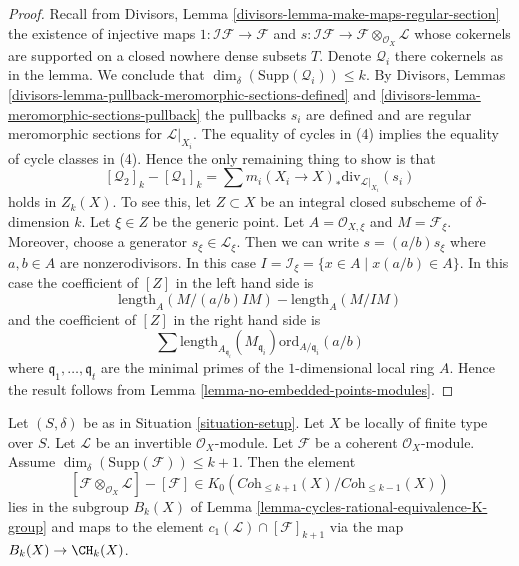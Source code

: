 \begin{proof}
Recall from Divisors, Lemma \ref{divisors-lemma-make-maps-regular-section}
the existence of injective maps
$1 : \mathcal{I}\mathcal{F} \to \mathcal{F}$ and
$s : \mathcal{I}\mathcal{F} \to \mathcal{F} \otimes_{\mathcal{O}_X}\mathcal{L}$
whose cokernels are supported on a closed nowhere dense subsets $T$.
Denote $\mathcal{Q}_i$ there cokernels as in the lemma.
We conclude that $\dim_\delta(\text{Supp}(\mathcal{Q}_i)) \leq k$.
By Divisors, Lemmas \ref{divisors-lemma-pullback-meromorphic-sections-defined}
and \ref{divisors-lemma-meromorphic-sections-pullback} the pullbacks $s_i$
are defined and are regular meromorphic sections for $\mathcal{L}|_{X_i}$.
The equality of cycles in (4) implies the equality of cycle classes
in (4). Hence the only remaining thing to show is that
$$
[\mathcal{Q}_2]_k - [\mathcal{Q}_1]_k
=
\sum m_i(X_i \to X)_*\text{div}_{\mathcal{L}|_{X_i}}(s_i)
$$
holds in $Z_k(X)$. To see this, let $Z \subset X$ be an integral closed
subscheme of $\delta$-dimension $k$. Let $\xi \in Z$ be the generic point.
Let $A = \mathcal{O}_{X, \xi}$ and $M = \mathcal{F}_\xi$.
Moreover, choose a generator $s_\xi \in \mathcal{L}_\xi$.
Then we can write $s = (a/b) s_\xi$ where $a, b \in A$ are
nonzerodivisors. In this case
$I = \mathcal{I}_\xi = \{x \in A \mid x(a/b) \in A\}$.
In this case the coefficient of $[Z]$ in the left hand side is
$$
\text{length}_A(M/(a/b)IM) - \text{length}_A(M/IM)
$$
and the coefficient of $[Z]$ in the right hand side
is
$$
\sum
\text{length}_{A_{\mathfrak q_i}}(M_{\mathfrak q_i})
\text{ord}_{A/\mathfrak q_i}(a/b)
$$
where $\mathfrak q_1, \ldots, \mathfrak q_t$ are the minimal
primes of the $1$-dimensional local ring $A$. Hence the result
follows from Lemma \ref{lemma-no-embedded-points-modules}.
\end{proof}

\begin{lemma}
\label{lemma-coherent-sheaf-cap-c1}
Let $(S, \delta)$ be as in Situation \ref{situation-setup}.
Let $X$ be locally of finite type over $S$.
Let $\mathcal{L}$ be an invertible $\mathcal{O}_X$-module.
Let $\mathcal{F}$ be a coherent $\mathcal{O}_X$-module.
Assume $\dim_\delta(\text{Supp}(\mathcal{F})) \leq k + 1$.
Then the element
$$
[\mathcal{F} \otimes_{\mathcal{O}_X} \mathcal{L}]
-
[\mathcal{F}]
\in
K_0(\textit{Coh}_{\leq k + 1}(X)/\textit{Coh}_{\leq k - 1}(X))
$$
lies in the subgroup $B_k(X)$ of
Lemma \ref{lemma-cycles-rational-equivalence-K-group} and maps to
the element $c_1(\mathcal{L}) \cap [\mathcal{F}]_{k + 1}$ via
the map $B_k(X) \to \CH_k(X)$.
\end{lemma}

